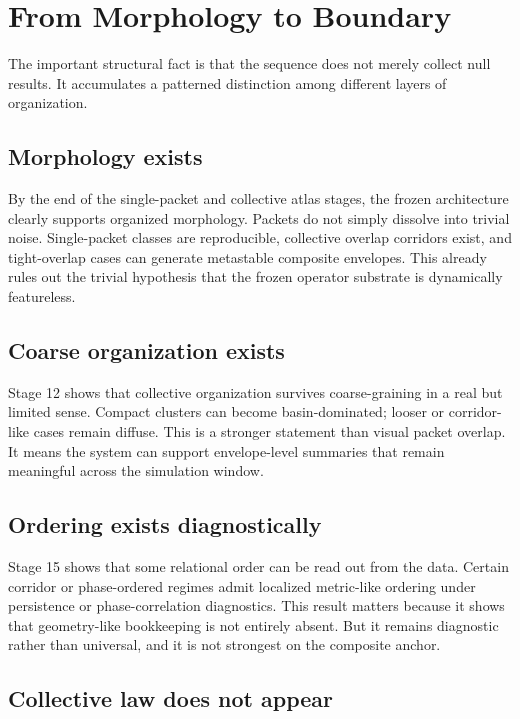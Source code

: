 \documentclass[11pt]{article}
\begin{document}
\section{From Morphology to Boundary}

The important structural fact is that the sequence does not merely collect null results. It accumulates a patterned distinction among different layers of organization.

\subsection{Morphology exists}

By the end of the single-packet and collective atlas stages, the frozen architecture clearly supports organized morphology. Packets do not simply dissolve into trivial noise. Single-packet classes are reproducible, collective overlap corridors exist, and tight-overlap cases can generate metastable composite envelopes. This already rules out the trivial hypothesis that the frozen operator substrate is dynamically featureless.

\subsection{Coarse organization exists}

Stage 12 shows that collective organization survives coarse-graining in a real but limited sense. Compact clusters can become basin-dominated; looser or corridor-like cases remain diffuse. This is a stronger statement than visual packet overlap. It means the system can support envelope-level summaries that remain meaningful across the simulation window.

\subsection{Ordering exists diagnostically}

Stage 15 shows that some relational order can be read out from the data. Certain corridor or phase-ordered regimes admit localized metric-like ordering under persistence or phase-correlation diagnostics. This result matters because it shows that geometry-like bookkeeping is not entirely absent. But it remains diagnostic rather than universal, and it is not strongest on the composite anchor.

\subsection{Collective law does not appear}
\end{document}
